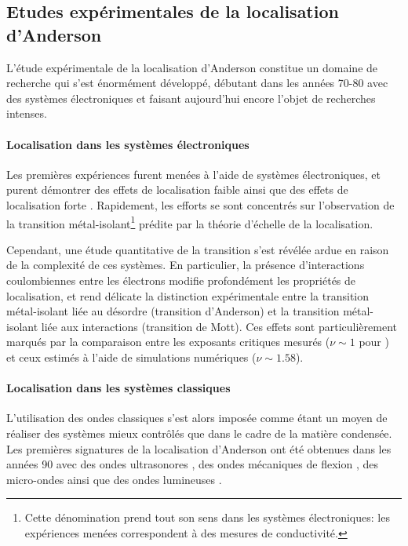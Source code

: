 \subsection{Etudes expérimentales de la localisation d'Anderson}
L'étude expérimentale de la localisation d'Anderson constitue un domaine de recherche qui s'est énormément développé, débutant dans les années 70-80 avec des systèmes électroniques et faisant aujourd'hui encore l'objet de recherches intenses.

\paragraph*{Localisation dans les systèmes électroniques}
Les premières expériences furent menées à l'aide de systèmes électroniques, et purent démontrer des effets de localisation faible ainsi que des effets de localisation forte \citep{mott1979electronic}\citep{paalanen1983critical}. Rapidement, les efforts se sont concentrés sur l'observation de la transition métal-isolant\footnote{Cette dénomination prend tout son sens dans les systèmes électroniques: les expériences menées correspondent à des mesures de conductivité.} prédite par la théorie d'échelle de la localisation. 

Cependant, une étude quantitative de la transition s'est révélée ardue en raison de la complexité de ces systèmes. En particulier, la présence d'interactions coulombiennes entre les électrons modifie profondément les propriétés de localisation, et rend délicate la distinction expérimentale entre la transition métal-isolant liée au désordre (transition d'Anderson) et la transition métal-isolant liée aux interactions (transition de Mott). Ces effets sont particulièrement marqués par la comparaison entre les exposants critiques mesurés ($\nu\sim 1$ pour \citep{shlimak1996determination}) et ceux estimés à l'aide de simulations numériques ($\nu\sim1.58$).


\paragraph*{Localisation dans les systèmes classiques} 
L'utilisation des ondes classiques s'est alors imposée comme étant un moyen de réaliser des systèmes mieux contrôlés que dans le cadre de la matière condensée. Les premières signatures de la localisation d'Anderson ont été obtenues dans les années 90 avec des ondes ultrasonores \citep{weaver1990anderson}, des ondes mécaniques de flexion \citep{ye1992observation}, des micro-ondes \citep{genack1991observation} ainsi que des ondes lumineuses \citep{wiersma1997localization}. 

